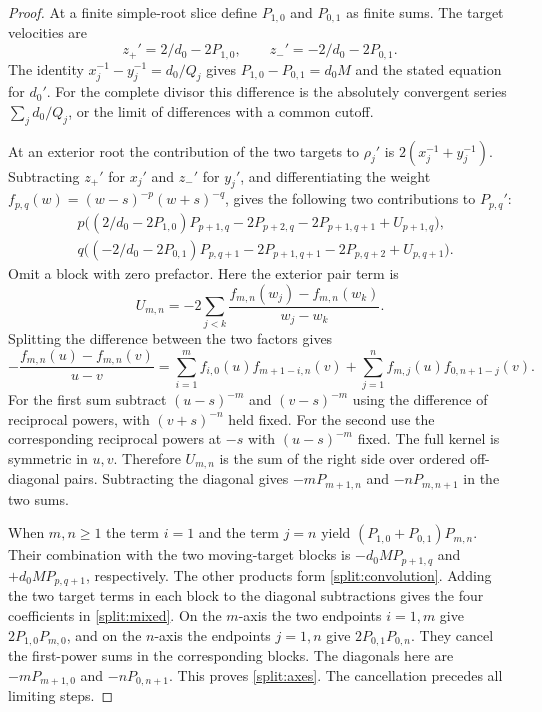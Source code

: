 \begin{proof}
At a finite simple-root slice define \(P_{1,0}\) and \(P_{0,1}\)
as finite sums. The target velocities are
\[
 z_+'=2/d_0-2P_{1,0},\qquad z_-'=-2/d_0-2P_{0,1}.
\]
The identity \(x_j^{-1}-y_j^{-1}=d_0/Q_j\) gives
\(P_{1,0}-P_{0,1}=d_0M\) and the stated equation for \(d_0'\).
For the complete divisor this difference is the absolutely
convergent series \(\sum_j d_0/Q_j\), or the limit of differences
with a common cutoff.

At an exterior root the contribution of the two targets to
\(\rho_j'\) is \(2(x_j^{-1}+y_j^{-1})\).
Subtracting \(z_+'\) for \(x_j'\) and \(z_-'\) for \(y_j'\), and
differentiating the weight \(f_{p,q}(w)=(w-s)^{-p}(w+s)^{-q}\),
gives the following two contributions to \(P_{p,q}'\):
\begin{align*}
 &p\bigl((2/d_0-2P_{1,0})P_{p+1,q}
                    -2P_{p+2,q}-2P_{p+1,q+1}+U_{p+1,q}\bigr),\\
 &q\bigl((-2/d_0-2P_{0,1})P_{p,q+1}
                    -2P_{p+1,q+1}-2P_{p,q+2}+U_{p,q+1}\bigr).
\end{align*}
Omit a block with zero prefactor. Here the exterior pair term is
\[
 U_{m,n}=-2\sum_{j<k}
        \frac{f_{m,n}(w_j)-f_{m,n}(w_k)}{w_j-w_k}.
\]
Splitting the difference between the two factors gives
\begin{equation}
 -\frac{f_{m,n}(u)-f_{m,n}(v)}{u-v}
   =\sum_{i=1}^{m} f_{i,0}(u)f_{m+1-i,n}(v)
     +\sum_{j=1}^{n} f_{m,j}(u)f_{0,n+1-j}(v).
 \label{split:divdiff}
\end{equation}
For the first sum subtract \((u-s)^{-m}\) and \((v-s)^{-m}\)
using the difference of reciprocal powers, with
\((v+s)^{-n}\) held fixed. For the second use the corresponding
reciprocal powers at \(-s\) with \((u-s)^{-m}\) fixed.
The full kernel is symmetric in \(u,v\). Therefore \(U_{m,n}\)
is the sum of the right side over ordered off-diagonal pairs.
Subtracting the diagonal gives \(-mP_{m+1,n}\) and
\(-nP_{m,n+1}\) in the two sums.

When \(m,n\geq1\) the term \(i=1\) and the term \(j=n\) yield
\((P_{1,0}+P_{0,1})P_{m,n}\). Their combination with the two
moving-target blocks is \(-d_0MP_{p+1,q}\) and
\(+d_0MP_{p,q+1}\), respectively. The other products form
\eqref{split:convolution}. Adding the two target terms in each
block to the diagonal subtractions gives the four coefficients
in \eqref{split:mixed}. On the \(m\)-axis the two endpoints
\(i=1,m\) give \(2P_{1,0}P_{m,0}\), and on the \(n\)-axis the
endpoints \(j=1,n\) give \(2P_{0,1}P_{0,n}\). They cancel the
first-power sums in the corresponding blocks. The diagonals
here are \(-mP_{m+1,0}\) and \(-nP_{0,n+1}\). This proves
\eqref{split:axes}. The cancellation precedes all limiting steps.


\end{proof}

